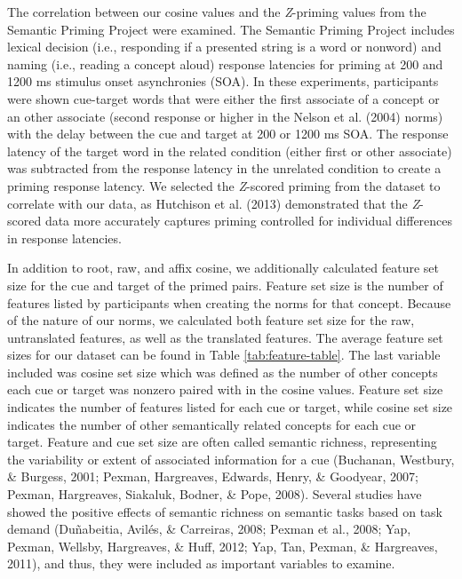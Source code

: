 \documentclass[english,,man]{apa6}
\begin{document}
The correlation between our cosine values and the \emph{Z}-priming values from the Semantic Priming Project were examined. The Semantic Priming Project includes lexical decision (i.e., responding if a presented string is a word or nonword) and naming (i.e., reading a concept aloud) response latencies for priming at 200 and 1200 ms stimulus onset asynchronies (SOA). In these experiments, participants were shown cue-target words that were either the first associate of a concept or an other associate (second response or higher in the Nelson et al. (2004) norms) with the delay between the cue and target at 200 or 1200 ms SOA. The response latency of the target word in the related condition (either first or other associate) was subtracted from the response latency in the unrelated condition to create a priming response latency. We selected the \emph{Z}-scored priming from the dataset to correlate with our data, as Hutchison et al. (2013) demonstrated that the \emph{Z}-scored data more accurately captures priming controlled for individual differences in response latencies.

In addition to root, raw, and affix cosine, we additionally calculated feature set size for the cue and target of the primed pairs. Feature set size is the number of features listed by participants when creating the norms for that concept. Because of the nature of our norms, we calculated both feature set size for the raw, untranslated features, as well as the translated features. The average feature set sizes for our dataset can be found in Table \ref{tab:feature-table}. The last variable included was cosine set size which was defined as the number of other concepts each cue or target was nonzero paired with in the cosine values. Feature set size indicates the number of features listed for each cue or target, while cosine set size indicates the number of other semantically related concepts for each cue or target. Feature and cue set size are often called semantic richness, representing the variability or extent of associated information for a cue (Buchanan, Westbury, \& Burgess, 2001; Pexman, Hargreaves, Edwards, Henry, \& Goodyear, 2007; Pexman, Hargreaves, Siakaluk, Bodner, \& Pope, 2008). Several studies have showed the positive effects of semantic richness on semantic tasks based on task demand (Duñabeitia, Avilés, \& Carreiras, 2008; Pexman et al., 2008; Yap, Pexman, Wellsby, Hargreaves, \& Huff, 2012; Yap, Tan, Pexman, \& Hargreaves, 2011), and thus, they were included as important variables to examine.
\end{document}
